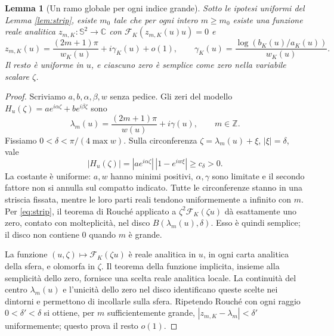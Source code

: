 \documentclass[11pt,a4paper]{article}
\newtheorem{lemma}[theorem]{Lemma}
\theoremstyle{remark}
\newcommand{\Sph}{\mathbb S^2}
\begin{document}
\begin{lemma}[Un ramo globale per ogni indice grande]\label{lem:branches}
Sotto le ipotesi uniformi del Lemma \ref{lem:strip}, esiste $m_0$ tale che
per ogni intero $m\geq m_0$ esiste una funzione reale analitica
$z_{m,K}:\Sph\to\mathbb C$ con
$\mathcal F_K(z_{m,K}(u)u)=0$ e
\begin{equation}\label{eq:rootasymptotic}
z_{m,K}(u)=\frac{(2m+1)\pi}{w_K(u)}+i\gamma_K(u)+o(1),\qquad
\gamma_K(u)=\frac{\log(b_K(u)/a_K(u))}{w_K(u)}.
\end{equation}
Il resto è uniforme in $u$, e ciascuno zero è semplice come zero nella
variabile scalare $\zeta$.
\end{lemma}
\begin{proof}
Scriviamo $a,b,\alpha,\beta,w$ senza pedice. Gli zeri del modello
$H_u(\zeta)=a e^{i\alpha\zeta}+b e^{i\beta\zeta}$ sono
\[
\lambda_m(u)=\frac{(2m+1)\pi}{w(u)}+i\gamma(u),\qquad m\in\mathbb Z.
\]
Fissiamo $0<\delta<\pi/(4\max w)$. Sulla circonferenza
$\zeta=\lambda_m(u)+\xi$, $|\xi|=\delta$, vale
\[
|H_u(\zeta)|=|a e^{i\alpha\zeta}|\,|1-e^{iw\xi}|\geq c_\delta>0.
\]
La costante è uniforme: $a,w$ hanno minimi positivi, $\alpha,\gamma$
sono limitate e il secondo fattore non si annulla sul compatto indicato.
Tutte le circonferenze stanno in una striscia fissata, mentre le loro
parti reali tendono uniformemente a infinito con $m$.
Per \eqref{eq:strip}, il teorema di Rouché applicato a
$\zeta^2\mathcal F_K(\zeta u)$ dà esattamente uno zero, contato con
molteplicità, nel disco $B(\lambda_m(u),\delta)$. Esso è quindi semplice;
il disco non contiene $0$ quando $m$ è grande.

La funzione $(u,\zeta)\mapsto\mathcal F_K(\zeta u)$ è reale analitica
in $u$, in ogni carta analitica della sfera, e olomorfa in $\zeta$.
Il teorema della funzione implicita, insieme alla semplicità dello zero,
fornisce una scelta reale analitica locale. La continuità del centro
$\lambda_m(u)$ e l'unicità dello zero nel disco identificano queste
scelte nei dintorni e permettono di incollarle sulla sfera.
Ripetendo Rouché con ogni raggio $0<\delta'<\delta$ si ottiene, per $m$
sufficientemente grande, $|z_{m,K}-\lambda_m|<\delta'$ uniformemente;
questo prova il resto $o(1)$.
\end{proof}
\end{document}
